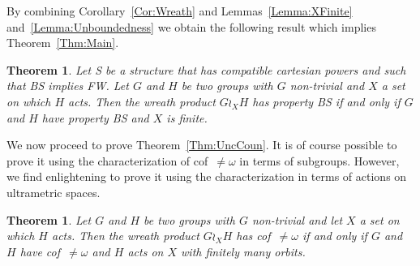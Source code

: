 \documentclass[a4paper]{article}
\newtheorem{thm}[lem]{Theorem}
\theoremstyle{definition}
\begin{document}
%
%
By combining Corollary~\ref{Cor:Wreath} and Lemmas~\ref{Lemma:XFinite} and~\ref{Lemma:Unboundedness} we obtain the following result which implies Theorem~\ref{Thm:Main}.
%
%
\begin{thm}\label{Thm:Technic}
Let S be a structure that has compatible cartesian powers and such that BS implies FW.
Let $G$ and $H$ be two groups with $G$ non-trivial and $X$ a set on which $H$ acts. Then the wreath product $G \wr_X H$ has property BS if and only if $G$ and $H$ have property BS and $X$ is finite.
\end{thm}
%
%
We now proceed to prove Theorem~\ref{Thm:UncCoun}.
It is of course possible to prove it using the characterization of cof~$\neq\omega$ in terms of subgroups. However, we find enlightening to prove it using the characterization in terms of actions on ultrametric spaces.
%
%
\begin{thm}
Let $G$ and $H$ be two groups with $G$ non-trivial and let $X$ a set on which $H$ acts. Then the wreath product $G \wr_X H$ has cof~$\neq\omega$ if and only if $G$ and $H$ have cof~$\neq\omega$ and $H$ acts on $X$ with finitely many orbits.
\end{thm}
\end{document}
